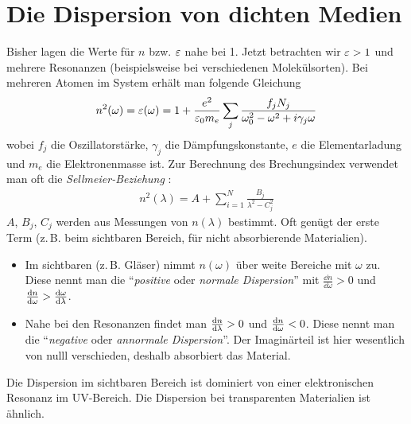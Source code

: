 \section{Die Dispersion von dichten Medien}
Bisher lagen die Werte für  $n$ bzw. $\eps$ nahe bei 1. Jetzt
betrachten wir $\eps>1$ und mehrere Resonanzen (beispielsweise bei
verschiedenen Molekülsorten). Bei mehreren Atomen im System erhält man
folgende Gleichung
\begin{gather}
  n^2(\omega)
  = \eps(\omega)
  = 1 + \frac{e^2}{\epso m_e}\sum_{j}
  \frac{f_jN_j}{\omegao^2-\omega^2+i\gamma_j\omega}
  \label{brechungsindexallg}
\end{gather} 
wobei $f_j$
die Oszillatorstärke,
$\gamma_j$ die
Dämpfungskonstante,
$e$ die Elementarladung und
$m_e$ die Elektronenmasse ist.
Zur Berechnung des Brechungsindex verwendet man oft die 
\emph{Sellmeier-Beziehung}%
:
\begin{align*}
  n^2(\lambda)= A + \sum_{i=1}^{N}\frac{B_j}{\lambda^2-C_j^2}
\end{align*}
$A$, $B_j$, $C_j$ werden aus Messungen von $n(\lambda)$ bestimmt. Oft
genügt der erste Term (z.\,B. beim sichtbaren Bereich, für nicht
absorbierende Materialien).
\begin{itemize}
\item Im sichtbaren (z.\,B. Gläser) nimmt $n(\omega)$ über weite
  Bereiche mit $\omega$ zu. Diese nennt man die 
  \enquote{\emph{positive} oder \emph{normale Dispersion}}%
  mit $\frac{\dd n}{\dd \omega}>0$
  und $\frac{\dd n}{\dd \omega}>\ddif[\omega]{\lambda}$.
\item Nahe bei den Resonanzen findet man $\ddif[n]{\lambda}>0$ und
  $\ddif[n]{\omega}<0$. Diese nennt man die 
  \enquote{\emph{negative} oder \emph{annormale Dispersion}}. 
  Der Imaginärteil ist hier wesentlich
  von nulll verschieden, deshalb absorbiert das Material. 
\end{itemize}

 Die Dispersion im sichtbaren Bereich
ist dominiert von einer elektronischen Resonanz im UV-Bereich. Die
Dispersion bei transparenten Materialien ist ähnlich.

